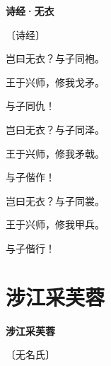 \documentclass[12pt,UTF-8,openany,fontset=none]{ctexbook}
\begin{document}

\begin{center}
    {\bfseries 诗经·无衣}

    \vspace{18pt}

    \begin{large}\xuwen
        〔诗经〕
    \end{large}

\end{center}

    \vspace{18pt}  %

\begin{center}
    \begin{Large}

        岂曰无衣？与子同袍。

        王于兴师，修我戈矛。

        与子同仇！\hspace{78pt}

        \vspace{18pt}  %

        岂曰无衣？与子同泽。

        王于兴师，修我矛戟。

        与子偕作！\hspace{78pt}

        \vspace{18pt}  %

        岂曰无衣？与子同裳。

        王于兴师，修我甲兵。

        与子偕行！\hspace{78pt}

    \end{Large}

\end{center}

\vspace{8pt}
\clearpage

\section{涉江采芙蓉}


\begin{center}
    {\bfseries 涉江采芙蓉}

    \vspace{18pt}

    \begin{large}\xuwen
        〔无名氏〕
    \end{large}

\end{center}
\end{document}
